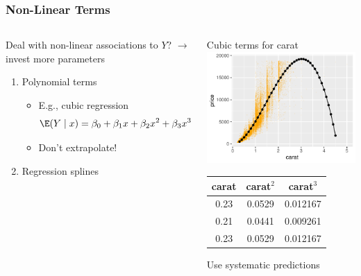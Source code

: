\begin{frame}
	\frametitle{Non-Linear Terms}
	\begin{columns}
		\begin{block}{Deal with non-linear associations to $Y$?} $\rightarrow$ invest more parameters
			\begin{enumerate}
				\item Polynomial terms
				\begin{itemize}
					\item E.g., cubic regression
					$$
					\E(Y \mid x) = \beta_0 + \beta_1 x + \beta_2 x^2 + \beta_3 x^3
					$$
					\item Don't extrapolate!
				\end{itemize}
				\item Regression splines
			\end{enumerate}
		\end{block}
		
		\begin{block}{\centering Cubic terms for carat}
			\includegraphics[width=1\textwidth]{pics/nonlinear.pdf}
			\vspace{-9em}
			\begin{scriptsize}
				\begin{table}
					\raggedleft
					\begin{tabular}{ccc}
						carat & carat$^2$ & carat$^3$ \\
						\hline
						0.23       &            0.0529       &          0.012167\\
						0.21       &            0.0441       &          0.009261\\
						0.23       &            0.0529       &          0.012167\\
						\hline
					\end{tabular}
				\end{table}
			\end{scriptsize}
			\vspace{3em}
			\centering Use systematic predictions
		\end{block}
	\end{columns}
\end{frame}

